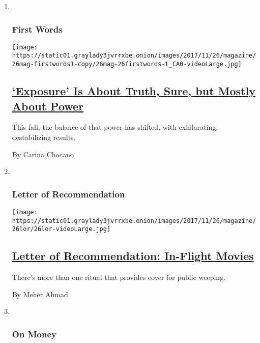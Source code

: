 \begin{enumerate}
\def\labelenumi{\arabic{enumi}.}
\item ~
  \hypertarget{first-words}{%
  \subsubsection{First Words}\label{first-words}}

  \texttt{[image: https://static01.graylady3jvrrxbe.onion/images/2017/11/26/magazine/26mag-firstwords1-copy/26mag-26firstwords-t\_CA0-videoLarge.jpg]}

  \hypertarget{exposure-is-about-truth-sure-but-mostly-about-power}{%
  \subsection{\texorpdfstring{\href{/2017/11/20/magazine/exposure-is-about-truth-sure-but-mostly-about-power.html}{`Exposure'
  Is About Truth, Sure, but Mostly About
  Power}}{`Exposure' Is About Truth, Sure, but Mostly About Power}}\label{exposure-is-about-truth-sure-but-mostly-about-power}}

  This fall, the balance of that power has shifted, with exhilarating,
  destabilizing results.

  By Carina Chocano
\item ~
  \hypertarget{letter-of-recommendation}{%
  \subsubsection{Letter of
  Recommendation}\label{letter-of-recommendation}}

  \texttt{[image: https://static01.graylady3jvrrxbe.onion/images/2017/11/26/magazine/26lor/26lor-videoLarge.jpg]}

  \hypertarget{letter-of-recommendation-in-flight-movies}{%
  \subsection{\texorpdfstring{\href{/2017/11/21/magazine/letter-of-recommendation-in-flight-movies.html}{Letter
  of Recommendation: In-Flight
  Movies}}{Letter of Recommendation: In-Flight Movies}}\label{letter-of-recommendation-in-flight-movies}}

  There's more than one ritual that provides cover for public weeping.

  By Meher Ahmad
\item ~
  \hypertarget{on-money}{%
  \subsubsection{On Money}\label{on-money}}


\end{enumerate}
